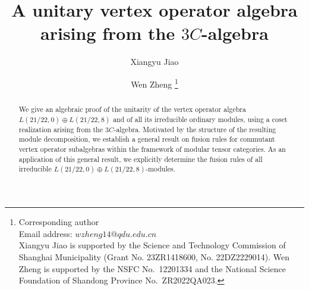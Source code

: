 \documentclass{article}
\begin{document}
	\title{A unitary vertex operator algebra arising from the $3C$-algebra}
	
	\author{Xiangyu Jiao}
	\author{Wen Zheng
		\footnote{Corresponding author\\
			Email address: $wzheng14@qdu.edu.cn$\\
			Xiangyu Jiao is supported by the  Science and Technology Commission of Shanghai Municipality (Grant No. 23ZR1418600, No. 22DZ2229014).
			Wen Zheng is supported by the NSFC No.~12201334 and the National Science Foundation of Shandong Province No.~ZR2022QA023.}}
	
	\maketitle
	
	\begin{abstract}

We give an algebraic proof of the unitarity of the vertex operator algebra $L(21/22, 0)\oplus L(21/22, 8)$ and of all its irreducible ordinary modules, using a coset realization arising from the $3C$-algebra. Motivated by the structure of the resulting module decomposition, we establish a general result on fusion rules for commutant vertex operator subalgebras within the framework of modular tensor categories. As an application of this general result, we explicitly determine the  fusion rules of all irreducible $L(21/22, 0)\oplus L(21/22, 8)$-modules.

	\end{abstract}
	
	\setcounter{tocdepth}{2}
	\tableofcontents
	
	
	
	\newpage
	
\end{document}
